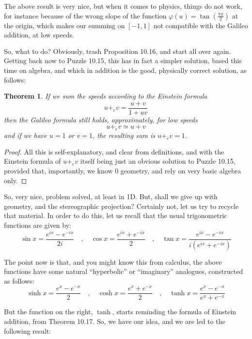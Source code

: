 \documentclass[12pt]{amsbook}
\newtheorem{theorem}{Theorem}[chapter]
\begin{document}
The above result is very nice, but when it comes to physics, things do not work, for instance because of the wrong slope of the function $\varphi(u)=\tan\left(\frac{\pi u}{2}\right)$ at the origin, which makes our summing on $[-1,1]$ not compatible with the Galileo addition, at low speeds.

\bigskip

So, what to do? Obviously, trash Proposition 10.16, and start all over again. Getting back now to Puzzle 10.15, this has in fact a simpler solution, based this time on algebra, and which in addition is the good, physically correct solution, as follows:


\begin{theorem}
If we sum the speeds according to the Einstein formula
$$u+_ev=\frac{u+v}{1+uv}$$
then the Galileo formula still holds, approximately, for low speeds
$$u+_ev\simeq u+v$$
and if we have $u=1$ or $v=1$, the resulting sum is $u+_ev=1$.
\end{theorem}

\begin{proof}
All this is self-explanatory, and clear from definitions, and with the Einstein formula of $u+_ev$ itself being just an obvious solution to Puzzle 10.15, provided that, importantly, we know 0 geometry, and rely on very basic algebra only.
\end{proof}

So, very nice, problem solved, at least in 1D. But, shall we give up with geometry, and the stereographic projection? Certainly not, let us try to recycle that material. In order to do this, let us recall that the usual trigonometric functions are given by:
$$\sin x=\frac{e^{ix}-e^{-ix}}{2i}\quad,\quad \cos x=\frac{e^{ix}+e^{-ix}}{2}\quad,\quad \tan x=\frac{e^{ix}-e^{-ix}}{i(e^{ix}+e^{-ix})}$$

The point now is that, and you might know this from calculus, the above functions have some natural ``hyperbolic'' or ``imaginary'' analogues, constructed as follows:
$$\sinh x=\frac{e^x-e^{-x}}{2}\quad,\quad \cosh x=\frac{e^x+e^{-x}}{2}\quad,\quad \tanh x=\frac{e^x-e^{-x}}{e^x+e^{-x}}$$

But the function on the right, $\tanh$, starts reminding the formula of Einstein addition, from Theorem 10.17. So, we have our idea, and we are led to the following result:

\end{document}
